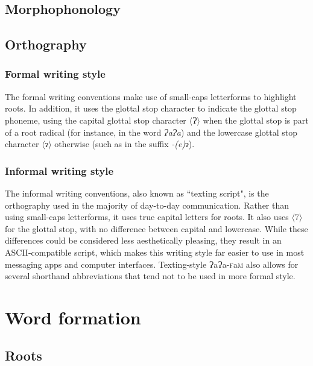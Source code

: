 \documentclass[a4paper,10pt,twoside,openright]{memoir}
\newcommand{\lang}{{\bigglot}a{\bigglot}a-\textsc{f}a\textsc{m}}
\newcommand{\sqbrack}[1]{$\langle$#1$\rangle$}
\newcommand{\bigglot}{Ɂ}
\newcommand{\lilglot}{ɂ}
\begin{document}
\section{Morphophonology}

\section{Orthography}
\subsection{Formal writing style}

The formal writing conventions make use of small-caps letterforms to highlight roots. In addition, it uses the glottal stop character to indicate the glottal stop phoneme, using the capital glottal stop character \sqbrack{\bigglot} when the glottal stop is part of a root radical (for instance, in the word \textit{\bigglot a\bigglot a}) and the lowercase glottal stop character \sqbrack{\lilglot} otherwise (such as in the suffix \textit{-(e)}\lilglot).

\subsection{Informal writing style}

The informal writing conventions, also known as ``texting script", is the orthography used in the majority of day-to-day communication. Rather than using small-caps letterforms, it uses true capital letters for roots. It also uses \sqbrack{7} for the glottal stop, with no difference between capital and lowercase. While these differences could be considered less aesthetically pleasing, they result in an ASCII-compatible script, which makes this writing style far easier to use in most messaging apps and computer interfaces. Texting-style \lang{} also allows for several shorthand abbreviations that tend not to be used in more formal style.

\chapter{Word formation}
\section{Roots}
\end{document}
